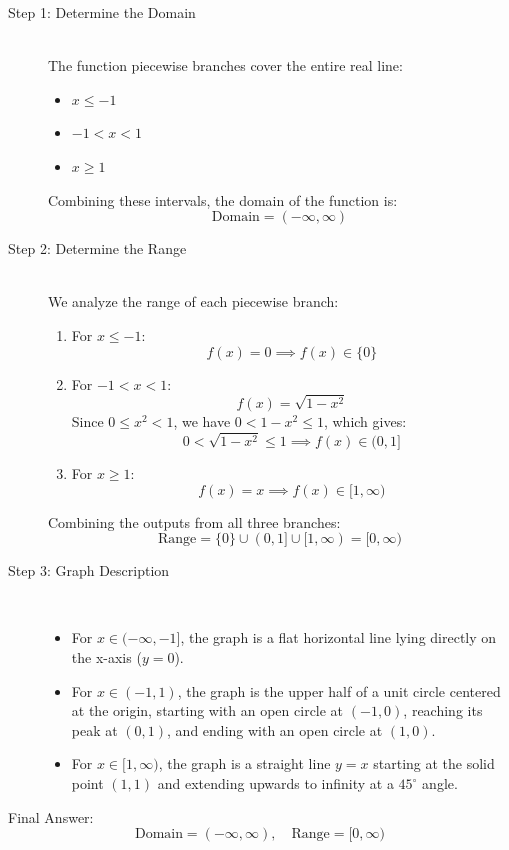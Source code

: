 \documentclass[11pt, a4paper]{article}
\begin{document}
\begin{description}
    \item[Step 1: Determine the Domain] \ \\
    The function piecewise branches cover the entire real line:
    \begin{itemize}
        \item $x \le -1$
        \item $-1 < x < 1$
        \item $x \ge 1$
    \end{itemize}
    Combining these intervals, the domain of the function is:
    \[ \text{Domain} = (-\infty, \infty) \]

    \item[Step 2: Determine the Range] \ \\
    We analyze the range of each piecewise branch:
    \begin{enumerate}
        \item For $x \le -1$:
        \[ f(x) = 0 \implies f(x) \in \{0\} \]
        \item For $-1 < x < 1$:
        \[ f(x) = \sqrt{1-x^2} \]
        Since $0 \le x^2 < 1$, we have $0 < 1 - x^2 \le 1$, which gives:
        \[ 0 < \sqrt{1-x^2} \le 1 \implies f(x) \in (0, 1] \]
        \item For $x \ge 1$:
        \[ f(x) = x \implies f(x) \in [1, \infty) \]
    \end{enumerate}
    Combining the outputs from all three branches:
    \[ \text{Range} = \{0\} \cup (0, 1] \cup [1, \infty) = [0, \infty) \]

    \item[Step 3: Graph Description] \ 
    \begin{itemize}
        \item For $x \in (-\infty, -1]$, the graph is a flat horizontal line lying directly on the x-axis ($y = 0$).
        \item For $x \in (-1, 1)$, the graph is the upper half of a unit circle centered at the origin, starting with an open circle at $(-1, 0)$, reaching its peak at $(0, 1)$, and ending with an open circle at $(1, 0)$.
        \item For $x \in [1, \infty)$, the graph is a straight line $y = x$ starting at the solid point $(1, 1)$ and extending upwards to infinity at a $45^\circ$ angle.
    \end{itemize}
\end{description}

Final Answer:
\[ 
\boxed{\text{Domain} = (-\infty, \infty), \quad \text{Range} = [0, \infty)} 
\]
\end{document}

